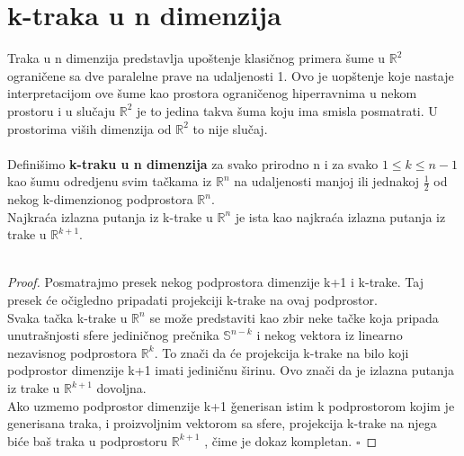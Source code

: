 \documentclass[11pt,letter]{article}
\begin{document}
\section[k-traka u n dimenzija]{k-traka u n dimenzija}
\bigskip
\indent Traka u n dimenzija predstavlja upo\v stenje klasi\v cnog primera \v sume u $\mathbb{R}^2$ ograni\v cene sa dve paralelne prave na udaljenosti 1. Ovo je uop\v stenje koje nastaje interpretacijom ove \v sume kao prostora ograni\v cenog hiperravnima u nekom prostoru i u slu\v caju $\mathbb{R}^2$ je to jedina takva \v suma koju ima smisla posmatrati. U prostorima vi\v sih dimenzija od $\mathbb{R}^2$ to nije slu\v caj.
\\
\smallskip
\\
\indent Defini\v simo \textbf{k-traku u n dimenzija} za svako prirodno n i za svako $1\leqslant k\leqslant n-1$  kao \v sumu odredjenu svim ta\v ckama iz $\mathbb{R}^n$ na udaljenosti manjoj ili jednakoj $\frac{1}{2}$ od nekog k-dimenzionog podprostora $\mathbb{R}^n$. 
\\
\teo Najkra\' ca izlazna putanja iz k-trake u $\mathbb{R}^n$ je ista kao najkra\' ca izlazna putanja iz trake u $\mathbb{R}^{k+1}$.
\\
\smallskip
\\
\begin{proof}
Posmatrajmo presek nekog podprostora dimenzije k+1 i k-trake. Taj presek \' ce o\v cigledno pripadati projekciji k-trake na ovaj podprostor.
\\
\indent  Svaka ta\v cka k-trake u $\mathbb{R}^n$ se mo\v ze predstaviti kao zbir neke ta\v cke koja pripada unutra\v snjosti sfere jedini\v cnog pre\v cnika $\mathbb{S}^{n-k}$ i nekog vektora iz linearno nezavisnog podprostora $\mathbb{R}^k$. To zna\v ci da \' ce projekcija k-trake na bilo koji podprostor dimenzije k+1 imati jedini\v cnu \v sirinu. Ovo zna\v ci da je izlazna putanja iz trake u  $\mathbb{R}^{k+1}$ dovoljna. 
\\
\indent Ako uzmemo podprostor dimenzije k+1 \v generisan istim k podprostorom kojim je generisana traka, i proizvoljnim vektorom sa sfere, projekcija k-trake na njega bi\' ce ba\v s traka u podprostoru $\mathbb{R}^{k+1}$ , \v cime je dokaz kompletan.
$\square$
\end{proof}
\end{document}
